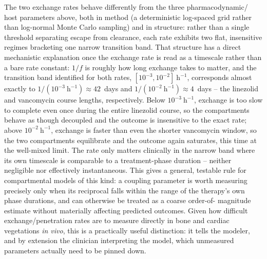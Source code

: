 \documentclass[11pt]{article}
\begin{document}
The two exchange rates behave differently from the three pharmacodynamic/
host parameters above, both in method (a deterministic log-spaced grid
rather than log-normal Monte Carlo sampling) and in structure: rather than
a single threshold separating escape from clearance, each rate exhibits two
flat, insensitive regimes bracketing one narrow transition band. That
structure has a direct mechanistic explanation once the exchange rate is
read as a timescale rather than a bare rate constant: $1/f$ is roughly how
long exchange takes to matter, and the transition band identified for both
rates, $[10^{-3}, 10^{-2}]~\mathrm{h}^{-1}$, corresponds almost exactly to
$1/(10^{-3}~\mathrm{h}^{-1}) \approx 42$~days and
$1/(10^{-2}~\mathrm{h}^{-1}) \approx 4$~days -- the linezolid and
vancomycin course lengths, respectively. Below $10^{-3}~\mathrm{h}^{-1}$,
exchange is too slow to complete even once during the entire linezolid
course, so the compartments behave as though decoupled and the outcome is
insensitive to the exact rate; above $10^{-2}~\mathrm{h}^{-1}$, exchange is
faster than even the shorter vancomycin window, so the two compartments
equilibrate and the outcome again saturates, this time at the well-mixed
limit. The rate only matters clinically in the narrow band where its own
timescale is comparable to a treatment-phase duration -- neither negligible
nor effectively instantaneous. This gives a general, testable rule for
compartmental models of this kind: a coupling parameter is worth measuring
precisely only when its reciprocal falls within the range of the therapy's
own phase durations, and can otherwise be treated as a coarse order-of-
magnitude estimate without materially affecting predicted outcomes. Given
how difficult exchange/penetration rates are to measure directly in bone
and cardiac vegetations \emph{in vivo}, this is a practically useful
distinction: it tells the modeler, and by extension the clinician
interpreting the model, which unmeasured parameters actually need to be
pinned down.
\end{document}
